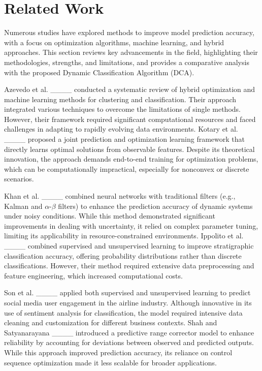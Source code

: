 \section{Related Work}
Numerous studies have explored methods to improve model prediction accuracy, with a focus on optimization algorithms, machine learning, and hybrid approaches. This section reviews key advancements in the field, highlighting their methodologies, strengths, and limitations, and provides a comparative analysis with the proposed Dynamic Classification Algorithm (DCA).

Azevedo et al. ____ conducted a systematic review of hybrid optimization and machine learning methods for clustering and classification. Their approach integrated various techniques to overcome the limitations of single methods. However, their framework required significant computational resources and faced challenges in adapting to rapidly evolving data environments. Kotary et al. ____ proposed a joint prediction and optimization learning framework that directly learns optimal solutions from observable features. Despite its theoretical innovation, the approach demands end-to-end training for optimization problems, which can be computationally impractical, especially for nonconvex or discrete scenarios.

Khan et al. ____ combined neural networks with traditional filters (e.g., Kalman and $\alpha$-$\beta$ filters) to enhance the prediction accuracy of dynamic systems under noisy conditions. While this method demonstrated significant improvements in dealing with uncertainty, it relied on complex parameter tuning, limiting its applicability in resource-constrained environments. Ippolito et al. ____ combined supervised and unsupervised learning to improve stratigraphic classification accuracy, offering probability distributions rather than discrete classifications. However, their method required extensive data preprocessing and feature engineering, which increased computational costs.

Son et al. ____ applied both supervised and unsupervised learning to predict social media user engagement in the airline industry. Although innovative in its use of sentiment analysis for classification, the model required intensive data cleaning and customization for different business contexts. Shah and Satyanarayana ____ introduced a predictive range corrector model to enhance reliability by accounting for deviations between observed and predicted outputs. While this approach improved prediction accuracy, its reliance on control sequence optimization made it less scalable for broader applications.

